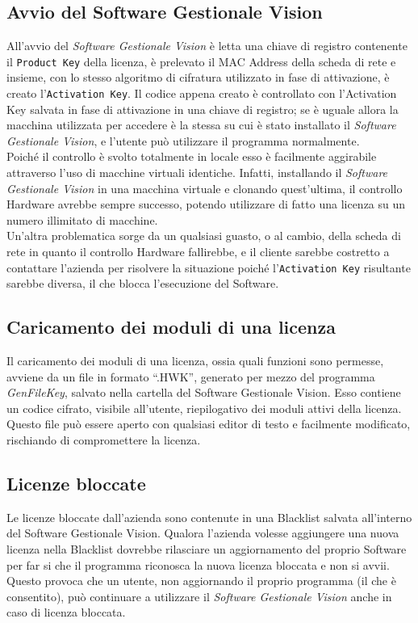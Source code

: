 \subsection{Avvio del Software Gestionale Vision} 

All'avvio del \textit{Software Gestionale Vision} è letta una chiave di registro contenente il \texttt{Product Key} della licenza, è prelevato il MAC Address della scheda di rete e insieme, con lo stesso algoritmo di cifratura utilizzato in fase di attivazione, è creato l'\texttt{Activation Key}. Il codice appena creato è controllato con l’Activation Key salvata in fase di attivazione in una chiave di registro; se è uguale allora la macchina utilizzata per accedere è la stessa su cui è stato installato il \textit{Software Gestionale Vision}, e l’utente può utilizzare il programma normalmente.\\
Poiché il controllo è svolto totalmente in locale esso è facilmente aggirabile attraverso l’uso di macchine virtuali identiche. Infatti, installando il \textit{Software Gestionale Vision} in una macchina virtuale e clonando quest'ultima, il controllo Hardware avrebbe sempre successo, potendo utilizzare di fatto una licenza su un numero illimitato di macchine. 
\\Un'altra problematica sorge da un qualsiasi guasto, o al cambio, della scheda di rete in quanto il controllo Hardware fallirebbe, e il cliente sarebbe costretto a contattare l’azienda per risolvere la situazione poiché l'\texttt{Activation Key} risultante sarebbe diversa, il che blocca l'esecuzione del Software.

\subsection{Caricamento dei moduli di una licenza} 
Il caricamento dei moduli di una licenza, ossia quali funzioni sono permesse, avviene da un file in formato “.HWK”, generato per mezzo del 
programma \textit{GenFileKey}, salvato nella cartella del Software Gestionale Vision. Esso contiene un codice cifrato, visibile all’utente, riepilogativo dei moduli attivi della licenza. Questo file può essere aperto con qualsiasi editor di testo e facilmente modificato, rischiando di compromettere la licenza.

\subsection{Licenze bloccate} 

Le licenze bloccate dall'azienda sono contenute in una Blacklist salvata all’interno del Software Gestionale Vision. Qualora l'azienda volesse aggiungere una nuova licenza nella Blacklist dovrebbe rilasciare un aggiornamento del proprio Software per far si che il programma riconosca la nuova licenza bloccata e non si avvii.
\\Questo provoca che un utente, non aggiornando il proprio programma (il che è consentito), può continuare a utilizzare il \textit{Software Gestionale Vision} anche in caso di licenza bloccata. 


